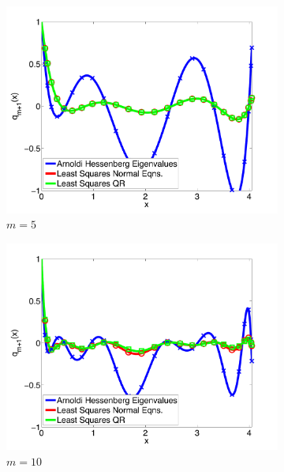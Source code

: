 \documentclass[10pt]{article}
\begin{document}
\begin{figure}
\centering
\begin{subfigure}[b]{0.49\linewidth}
\includegraphics[width=\textwidth]{gmres_poly5}
\caption{$m = 5$}
\end{subfigure}
\begin{subfigure}[b]{0.49\linewidth}
\includegraphics[width=\textwidth]{gmres_poly10}
\caption{$m = 10$}
\end{subfigure}
\begin{subfigure}[b]{0.49\linewidth}

\end{subfigure}
\end{figure}
\end{document}
